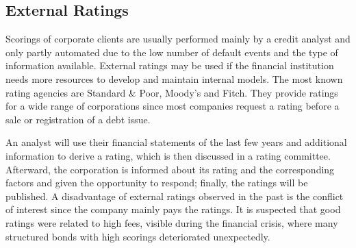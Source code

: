 \subsection{External Ratings}
Scorings of corporate clients are usually performed mainly by a credit analyst and only partly automated due to the low number of default events and the type of information available. External ratings may be used if the financial institution needs more resources to develop and maintain internal models. The most known rating agencies are Standard \& Poor, Moody's and Fitch. They provide ratings for a wide range of corporations since most companies request a rating before a sale or registration of a debt issue. 

An analyst will use their financial statements of the last few years and additional information to derive a rating, which is then discussed in a rating committee. Afterward, the corporation is informed about its rating and the corresponding factors and given the opportunity to respond; finally, the ratings will be published. A disadvantage of external ratings observed in the past is the conflict of interest since the company mainly pays the ratings. It is suspected that good ratings were related to high fees, visible during the financial crisis, where many structured bonds with high scorings deteriorated unexpectedly. \cite[pp.~34-36]{Witzany:2017}